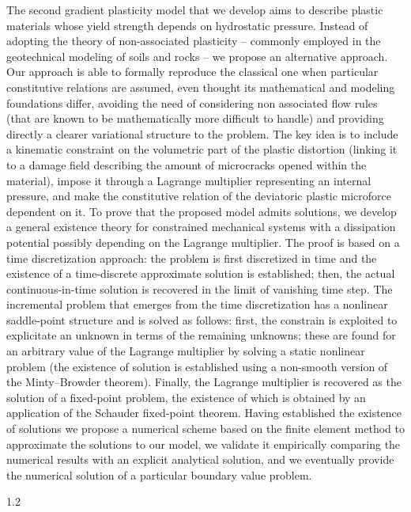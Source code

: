 \documentclass[a4paper,10pt,oneside]{amsbook}
\numberwithin{section}{chapter}
\numberwithin{equation}{chapter}
\theoremstyle{definition}
\begin{document}
The second gradient plasticity model that we develop aims to describe plastic materials whose yield strength depends on hydrostatic pressure. Instead of adopting the theory of non-associated plasticity -- commonly employed in the geotechnical modeling of soils and rocks -- we propose an alternative approach. Our approach is able to formally reproduce the classical one when particular constitutive relations are assumed, even thought its mathematical and modeling foundations differ, avoiding the need of considering non associated flow rules (that are known to be mathematically more difficult to handle) and providing directly a clearer variational structure to the problem. The key idea is to include a kinematic constraint on the volumetric part of the plastic distortion (linking it to a damage field describing the amount of microcracks opened within the material), impose it through a Lagrange multiplier representing an internal pressure, and make the constitutive relation of the deviatoric plastic microforce dependent on it. To prove that the proposed model admits solutions, we develop a general existence theory for constrained mechanical systems with a dissipation potential possibly depending on the Lagrange multiplier. The proof is based on a time discretization approach: the problem is first discretized in time and the existence of a time-discrete approximate solution is established; then, the actual continuous-in-time solution is recovered in the limit of vanishing time step. The incremental problem that emerges from the time discretization has a nonlinear saddle-point structure and is solved as follows: first, the constrain is exploited to explicitate an unknown in terms of the remaining unknowns; these are found for an arbitrary value of the Lagrange multiplier by solving a static nonlinear problem (the existence of solution is established using a non-smooth version of the Minty--Browder theorem). Finally, the Lagrange multiplier is recovered as the solution of a fixed-point problem, the existence of which is obtained by an application of the Schauder fixed-point theorem. Having established the existence of solutions we propose a numerical scheme based on the finite element method to approximate the solutions to our model, we validate it empirically comparing the numerical results with an explicit analytical solution, and we eventually provide the numerical solution of a particular boundary value problem.

\vspace*{\fill}

\begin{spacing}{1.2}
\tableofcontents
\end{spacing}
\end{document}
